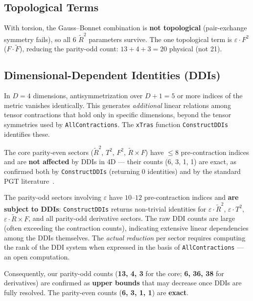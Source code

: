 \documentclass[12pt,a4paper]{article}
\newcommand{\Rt}{\tilde{R}}         %
\newcommand{\eps}{\varepsilon}       %
\begin{document}
\subsection{Topological Terms}
\label{sec:topological}

With torsion, the Gauss--Bonnet combination is \textbf{not topological}
(pair-exchange symmetry fails), so all 6 $\Rt^2$ parameters survive.
The one topological term is $\eps \cdot F^2$ ($F \cdot \tilde{F}$),
reducing the parity-odd count: $13 + 4 + 3 = 20$ physical
(not 21).


\subsection{Dimensional-Dependent Identities (DDIs)}
\label{sec:ddis}

In $D=4$ dimensions, antisymmetrization over $D{+}1 = 5$ or more
indices of the metric vanishes identically. This generates
\emph{additional} linear relations among tensor contractions that
hold only in specific dimensions, beyond the tensor symmetries used
by \texttt{AllContractions}. The \texttt{xTras} function
\texttt{ConstructDDIs} identifies these.

The core parity-even sectors ($\Rt^2$, $T^2$, $F^2$, $\Rt \times F$)
have $\leq 8$ pre-contraction indices and are \textbf{not affected}
by DDIs in 4D --- their counts (6, 3, 1, 1) are exact, as confirmed
both by \texttt{ConstructDDIs} (returning 0 identities) and by the
standard PGT literature~\cite{Barker:2024ydb,HayashiShirafuji}.

The parity-odd sectors involving $\eps$ have $10$--$12$
pre-contraction indices and \textbf{are subject to DDIs}:
\texttt{ConstructDDIs} returns non-trivial identities for
$\eps \cdot \Rt^2$, $\eps \cdot T^2$, $\eps \cdot \Rt \times F$,
and all parity-odd derivative sectors. The raw DDI counts are large
(often exceeding the contraction counts), indicating extensive
linear dependencies among the DDIs themselves. The
\emph{actual reduction} per sector requires computing the rank of
the DDI system when expressed in the basis of
\texttt{AllContractions} --- an open computation.

Consequently, our parity-odd counts (\textbf{13, 4, 3} for the
core; \textbf{6, 36, 38} for derivatives) are confirmed as
\textbf{upper bounds} that may decrease once DDIs are fully resolved.
The parity-even counts (\textbf{6, 3, 1, 1}) are \textbf{exact}.
\end{document}
